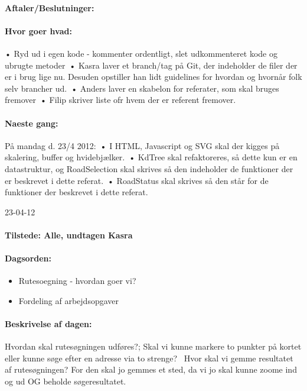 \documentclass[a4paper,10pt,titlepage]{article}
\begin{document}
		\paragraph{Aftaler/Beslutninger:}
		
		\paragraph{Hvor goer hvad:}
		•	Ryd ud i egen kode - kommenter ordentligt, slet udkommenteret kode og ubrugte metoder\
•	Kasra laver et branch/tag på Git, der indeholder de filer der er i brug lige nu. Desuden opstiller han lidt guidelines for hvordan og hvornår folk selv brancher ud.\
•	Anders laver en skabelon for referater, som skal bruges fremover\
•	Filip skriver liste ofr hvem der er referent fremover.


		\paragraph{Naeste gang:}
På mandag d. 23/4 2012:\
•	I HTML, Javascript og SVG skal der kigges på skalering, buffer og hvidebjælker.\
•	KdTree skal refaktoreres, så dette kun er en datastruktur, og RoadSelection skal skrives så den indeholder de funktioner der er beskrevet i dette referat.\
•	RoadStatus skal skrives så den står for de funktioner der beskrevet i dette referat.\mbox{}\\

\begin{center}
		23-04-12
		\end{center}
		
		\paragraph{Tilstede: Alle, undtagen Kasra}
		\paragraph{Dagsorden:}
		\begin{itemize}
					\item Rutesoegning - hvordan goer vi?
					\item Fordeling af arbejdsopgaver
		\end{itemize}
		
		\paragraph{Beskrivelse af dagen:}
		Hvordan skal rutesøgningen udføres?; Skal vi kunne markere to punkter på  kortet eller kunne søge efter en adresse via to strenge? \
Hvor skal vi gemme resultatet af rutesøgningen? For den skal jo gemmes et sted, da vi jo skal kunne zoome ind og ud OG beholde søgeresultatet.  
\end{document}
